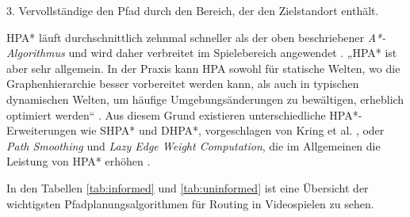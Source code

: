 3. Vervollständige den Pfad durch den Bereich, der den Zielstandort enthält.\\

\begin{sloppypar}
HPA* läuft durchschnittlich zehnmal schneller als der oben beschriebener\textit{ A*-Algorithmus} \cite[S. 1, 26]{Bot04} und wird daher verbreitet im Spielebereich angewendet \cite{LSC08}. „HPA* ist aber sehr allgemein. In der Praxis kann HPA sowohl für statische Welten, wo die Graphenhierarchie besser vorbereitet werden kann, als auch in typischen dynamischen Welten, um häufige Umgebungsänderungen zu bewältigen, erheblich optimiert werden“ \cite[S.39]{Kri10}. Aus diesem Grund existieren unterschiedliche HPA*-Erweiterungen wie SHPA* und DHPA*, vorgeschlagen von Kring et al. \cite[S.40ff.]{Kri10}, oder \textit{Path Smoothing} und \textit{Lazy Edge Weight Computation}, die im Allgemeinen die Leistung von HPA* erhöhen \cite{JB07}.
\end{sloppypar}

In den Tabellen \ref{tab:informed} und \ref{tab:uninformed} ist eine Übersicht der wichtigsten Pfadplanungsalgorithmen für Routing in Videospielen zu sehen.


